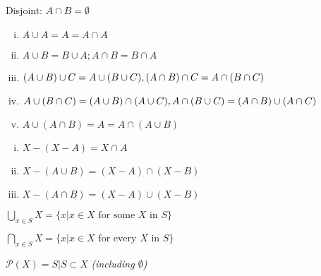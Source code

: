 \begin{definition}[disjoint]
  Disjoint: $A \cap B = \emptyset$
\end{definition}
\begin{theorem}
  \leavevmode
  \vspace{-\baselineskip}
  \begin{enumerate}[(i)]
    \item $A \cup A = A = A \cap A$
    \item $A \cup B = B \cup A; A \cap B = B \cap A$
    \item $(A \cup B) \cup C = A \cup (B \cup C),\\
           (A \cap B) \cap C = A \cap (B \cap C)$
    \item $A \cup (B \cap C) = (A \cup B) \cap (A \cup C),\\
           A \cap (B \cup C) = (A \cap B) \cup (A \cap C)$
    \item $A \cup (A \cap B) = A = A \cap (A \cup B)$
  \end{enumerate}
\end{theorem}
\begin{theorem}
  \leavevmode
  \vspace{-\baselineskip}
  \begin{enumerate}[(i)]
    \item $X - (X - A) = X \cap A$
    \item $X - (A \cup B) = (X - A) \cap (X - B)$
    \item $X - (A \cap B) = (X - A) \cup (X - B)$
  \end{enumerate}
\end{theorem}
\begin{definition}
  $\bigcup_{x \in S}X = \{x | x \in X \text{ for some } X \text{ in } S\}$
\end{definition}
\begin{definition}
  $\bigcap_{x \in S}X = \{x | x \in X \text{ for every } X \text{ in } S\}$
\end{definition}
\begin{definition}
  $\mathcal{P}(X) = {S | S \subset X}$ \textit{(including $\emptyset$)}
\end{definition}
